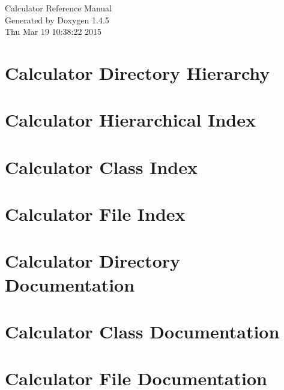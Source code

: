 \documentclass[a4paper]{book}
\begin{document}
\begin{titlepage}
\vspace*{7cm}
\begin{center}
{\Large Calculator Reference Manual}\\
\vspace*{1cm}
{\large Generated by Doxygen 1.4.5}\\
\vspace*{0.5cm}
{\small Thu Mar 19 10:38:22 2015}\\
\end{center}
\end{titlepage}
\clearemptydoublepage
{}
\tableofcontents
\clearemptydoublepage
{}
\chapter{Calculator Directory Hierarchy}

\chapter{Calculator Hierarchical Index}

\chapter{Calculator Class Index}

\chapter{Calculator File Index}

\chapter{Calculator Directory Documentation}





\chapter{Calculator Class Documentation}






\chapter{Calculator File Documentation}











\printindex
\end{document}
